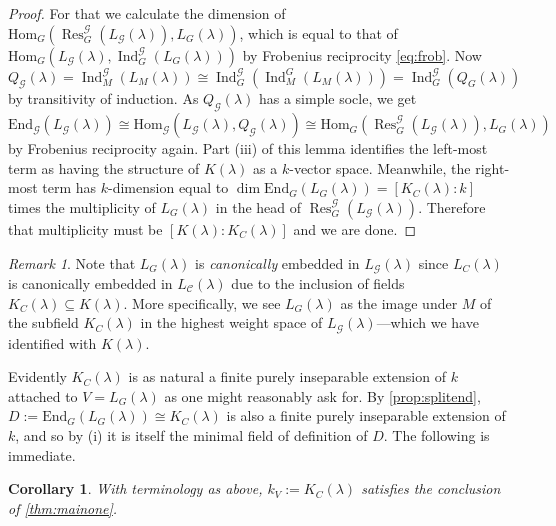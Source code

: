 \documentclass[11pt,reqno]{amsart}
\newtheorem{cor}[lemma]{Corollary}
\theoremstyle{definition}
\theoremstyle{remark}
\newtheorem{remark}[lemma]{Remark}
\theoremstyle{definition}
\theoremstyle{plain}
\DeclareMathOperator{\Res}{Res}
\DeclareMathOperator{\Ind}{Ind}
\newcommand{\G}{\mathscr{G}}
\newcommand{\Hom}{\mathrm{Hom}}
\newcommand{\End}{\mathrm{End}}
\newcommand{\C}{\mathscr{C}}
\begin{document}
\begin{proof}
For that we calculate the dimension of $\Hom_G(\Res^\G_G(L_\G(\lambda)),L_G(\lambda))$, which is equal to that of $\Hom_G(L_\G(\lambda),\Ind_G^\G(L_G(\lambda)))$ by Frobenius reciprocity \eqref{eq:frob}. Now $$Q_\G(\lambda)=\Ind_M^\G(L_M(\lambda))\cong \Ind_G^\G(\Ind_M^G(L_M(\lambda)))=\Ind_G^\G(Q_G(\lambda))$$ by transitivity of induction. 
As $Q_\G(\lambda)$ has a simple socle, we get
\[\End_\G(L_\G(\lambda))\cong \Hom_\G(L_\G(\lambda),Q_\G(\lambda))\cong \Hom_G(\Res^\G_G(L_\G(\lambda)),L_G(\lambda))\]
by Frobenius reciprocity again. 
Part (iii) of this lemma identifies the left-most term as having the structure of $K(\lambda)$ as a $k$-vector space. 
Meanwhile, the right-most term has $k$-dimension equal to $\dim\End_G(L_G(\lambda))=[K_C(\lambda):k]$ times the multiplicity of $L_G(\lambda)$ in the head of $\Res^\G_G(L_\G(\lambda))$. Therefore that multiplicity must be $[K(\lambda):K_C(\lambda)]$ and we are done.
\end{proof}

\begin{remark}
  Note that $L_G(\lambda)$ is \emph{canonically} embedded in $L_\G(\lambda)$ since $L_C(\lambda)$ is canonically embedded in $L_\C(\lambda)$ due to the inclusion of fields $K_C(\lambda)\subseteq K(\lambda)$. More specifically, we see $L_G(\lambda)$ as the image under $M$ of the subfield $K_C(\lambda)$ in the highest weight space of $L_{\G}(\lambda)$---which we have identified with $K(\lambda)$.
\end{remark}

Evidently $K_C(\lambda)$ is as natural a finite purely inseparable extension of $k$  attached to $V=L_G(\lambda)$ as one might reasonably ask for.
By \cref{prop:splitend}, $D:=\End_G(L_G(\lambda))\cong K_C(\lambda)$ is also a finite purely inseparable extension of $k$, and so by (i) it is 
itself the minimal field of definition of $D$.
The following is immediate.
\begin{cor}\label{cor:splitrigid}
  With terminology as above, $k_V:=K_C(\lambda)$ satisfies the conclusion of \cref{thm:mainone}.
\end{cor}
\end{document}

